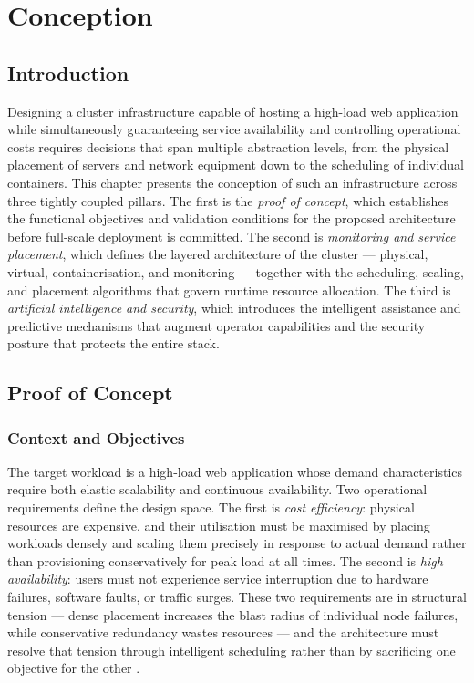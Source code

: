 \documentclass[a4paper, 12pt]{report}
\begin{document}
\chapter{Conception}
 
\section{Introduction}
 
Designing a cluster infrastructure capable of hosting a high-load web
application while simultaneously guaranteeing service availability and
controlling operational costs requires decisions that span multiple
abstraction levels, from the physical placement of servers and network
equipment down to the scheduling of individual containers.  This chapter
presents the conception of such an infrastructure across three tightly
coupled pillars.  The first is the \textit{proof of concept}, which
establishes the functional objectives and validation conditions for the
proposed architecture before full-scale deployment is committed.  The
second is \textit{monitoring and service placement}, which defines the
layered architecture of the cluster --- physical, virtual,
containerisation, and monitoring --- together with the scheduling,
scaling, and placement algorithms that govern runtime resource allocation.
The third is \textit{artificial intelligence and security}, which
introduces the intelligent assistance and predictive mechanisms that
augment operator capabilities and the security posture that protects
the entire stack.
 
\section{Proof of Concept}
 
\subsection{Context and Objectives}
 
The target workload is a high-load web application whose demand
characteristics require both elastic scalability and continuous
availability.  Two operational requirements define the design space.
The first is \textit{cost efficiency}: physical resources are expensive,
and their utilisation must be maximised by placing workloads densely and
scaling them precisely in response to actual demand rather than
provisioning conservatively for peak load at all times.  The second is
\textit{high availability}: users must not experience service interruption
due to hardware failures, software faults, or traffic surges.  These two
requirements are in structural tension --- dense placement increases the
blast radius of individual node failures, while conservative redundancy
wastes resources --- and the architecture must resolve that tension through
intelligent scheduling rather than by sacrificing one objective for the
other \cite{buyya2009cloud}.
 
\end{document}
